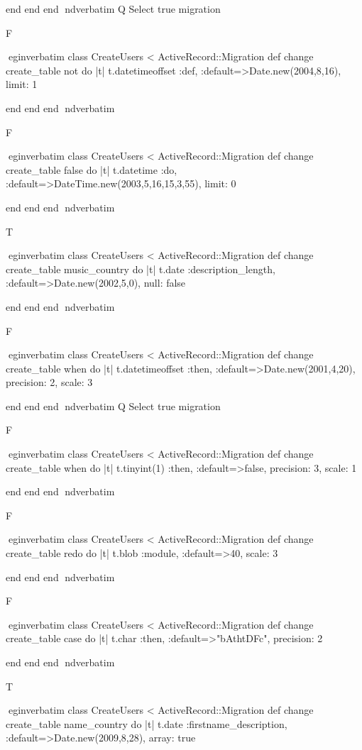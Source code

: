     end 
  end 
end
nd{verbatim}
Q
 Select true migration

F

egin{verbatim}
 class CreateUsers < ActiveRecord::Migration 
  def change 
    create_table not do |t| 
      t.datetimeoffset :def, :default=>Date.new(2004,8,16), limit: 1
    
    end 
  end 
end
nd{verbatim}

F

egin{verbatim}
 class CreateUsers < ActiveRecord::Migration 
  def change 
    create_table false do |t| 
      t.datetime :do, :default=>DateTime.new(2003,5,16,15,3,55), limit: 0
    
    end 
  end 
end
nd{verbatim}

T

egin{verbatim}
 class CreateUsers < ActiveRecord::Migration 
  def change 
    create_table music_country do |t| 
      t.date :description_length, :default=>Date.new(2002,5,0), null: false
    
    end 
  end 
end
nd{verbatim}

F

egin{verbatim}
 class CreateUsers < ActiveRecord::Migration 
  def change 
    create_table when do |t| 
      t.datetimeoffset :then, :default=>Date.new(2001,4,20), precision: 2, scale: 3
    
    end 
  end 
end
nd{verbatim}
Q
 Select true migration

F

egin{verbatim}
 class CreateUsers < ActiveRecord::Migration 
  def change 
    create_table when do |t| 
      t.tinyint(1) :then, :default=>false, precision: 3, scale: 1
    
    end 
  end 
end
nd{verbatim}

F

egin{verbatim}
 class CreateUsers < ActiveRecord::Migration 
  def change 
    create_table redo do |t| 
      t.blob :module, :default=>40, scale: 3
    
    end 
  end 
end
nd{verbatim}

F

egin{verbatim}
 class CreateUsers < ActiveRecord::Migration 
  def change 
    create_table case do |t| 
      t.char :then, :default=>"bAthtDFc", precision: 2
    
    end 
  end 
end
nd{verbatim}

T

egin{verbatim}
 class CreateUsers < ActiveRecord::Migration 
  def change 
    create_table name_country do |t| 
      t.date :firstname_description, :default=>Date.new(2009,8,28), array: true
    
